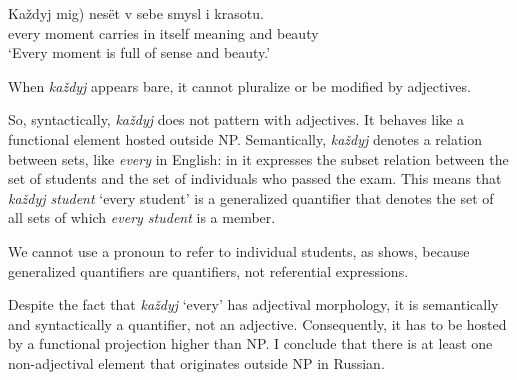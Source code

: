 \documentclass[output=paper,
colorlinks,
citecolor=brown,
newtxmath
]{langscibook}
\begin{document}

\ea \gll Každyj \minsp{*(} mig) nesët v sebe smysl i krasotu.\\
every {} moment carries in itself meaning and beauty\\
\glt `Every moment is full of sense and beauty.'
\z

\noindent When \textit{každyj} appears bare, it cannot pluralize or be modified by adjectives.


\ea 
\z\z 

\noindent So, syntactically, \textit{každyj} does not pattern with adjectives. It behaves like a functional element hosted outside NP. 
Semantically, \textit{každyj} denotes a relation between sets, like \textit{every} in English: in  it expresses the subset relation between the set of students and the set of individuals who passed the exam.  This means that \textit{každyj student} `every student' is a generalized quantifier that denotes the set of all sets of which \textit{every student} is a member. 


\ea\label{41_ekzamen}
\z\z 

\noindent We cannot use a pronoun to refer to individual students, as  shows, because generalized quantifiers are quantifiers, not referential expressions.  

Despite the fact that \textit{každyj} `every' has adjectival morphology, it is semantically and syntactically a quantifier, not an adjective. Consequently, it has to be hosted by a functional projection higher than NP. I conclude that there is at least one non-adjectival element that originates outside NP in Russian. 
%
%
\end{document}
